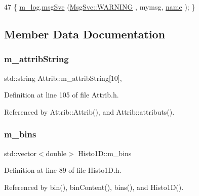\begin{DoxyCode}
47 \{ \hyperlink{classObject_a0d269813dd7ac1f24bc143031e2963f2}{m\_log}.\hyperlink{classMsgSvc_ad25f18047920cc59a314e5098259711c}{msgSvc} (\hyperlink{classMsgSvc_ae671eb7301996cd049d2da8a65925926a7cefae88f2ba26b2b05b676a383c834b}{MsgSvc::WARNING} , mymsg, \hyperlink{classObject_a300f4c05dd468c7bb8b3c968868443c1}{name} ); \}
\end{DoxyCode}


\subsection{Member Data Documentation}
\mbox{\label{classAttrib_a3414521d7a82476e874b25a5407b5e63}} 
\subsubsection{\texorpdfstring{m\+\_\+attrib\+String}{m\_attribString}}
{\footnotesize\ttfamily std\+::string Attrib\+::m\+\_\+attrib\+String\mbox{[}10\mbox{]}\hspace{0.3cm}{\ttfamily [protected]}, {\ttfamily [inherited]}}



Definition at line 105 of file Attrib.\+h.



Referenced by Attrib\+::\+Attrib(), and Attrib\+::attributs().

\mbox{\label{classHisto1D_a7a82923d3938739904469f5aa0a517ca}} 
\subsubsection{\texorpdfstring{m\+\_\+bins}{m\_bins}}
{\footnotesize\ttfamily std\+::vector$<$double$>$ Histo1\+D\+::m\+\_\+bins\hspace{0.3cm}{\ttfamily [private]}}



Definition at line 89 of file Histo1\+D.\+h.



Referenced by bin(), bin\+Content(), bins(), and Histo1\+D().

\mbox{\label{classHisto1D_a0e03676ed176aaad2f615fa84b8ffcd3}} 
